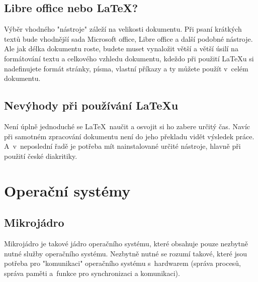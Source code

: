 \documentclass[11pt,a4paper,titlepage]{article}
\begin{document}
\subsection{Libre office nebo \LaTeX ?}
Výběr vhodného "nástroje" záleží na velikosti dokumentu. Při psaní krátkých textů
bude vhodnější sada Microsoft office, Libre office a další podobné nástroje. Ale jak délka
dokumentu roste, budete muset vynaložit větší a větší úsilí na formátování textu
a celkového vzhledu dokumentu, kdeždo při použití \LaTeX u si nadefinujete formát
stránky, písma, vlastní příkazy a ty můžete použít v~celém dokumentu.\cite{web:LibreOfficevsLatex}

\subsection{Nevýhody při používání \LaTeX u}
Není úplně jednoduché se \LaTeX~naučit a osvojit si ho zabere určitý čas.
Navíc při samotném zpracování dokumentu není do jeho překladu vidět výsledek práce.
A~v~neposlední řadě je potřeba mít nainstalované určité nástroje, hlavně při použití
české diakritiky.\cite{web:nevyhody-latex}

\newpage
\section{Operační systémy}
\subsection{Mikrojádro}
Mikrojádro je takové jádro operačního systému, které obsahuje pouze nezbytně nutné
služby operačního systému. Nezbytně nutné se rozumí takové, které jsou potřeba pro
"komunikaci" operačního systému s~hardwarem (správa procesů, správa paměti 
a~funkce pro synchronizaci a komunikaci).\cite{bc:mikrojadra}

\end{document}
